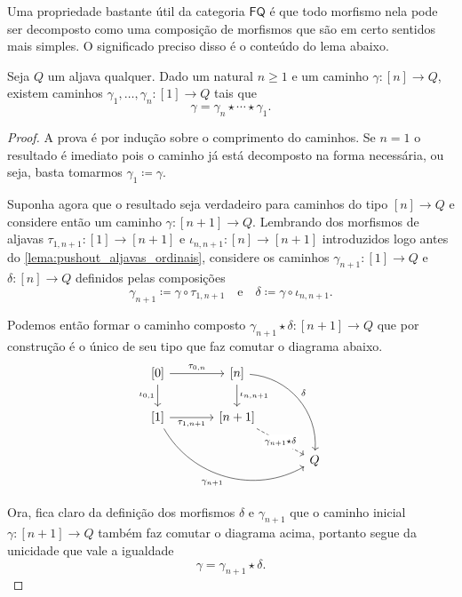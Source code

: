 Uma propriedade bastante útil da categoria $\mathsf{FQ}$ é que todo morfismo nela pode ser decomposto como uma composição de morfismos que são em certo sentidos mais simples.
O significado preciso disso é o conteúdo do lema abaixo.

\begin{lema}\label{lema:decompondo_caminhos_aljava}
    Seja $Q$ um aljava qualquer.
    Dado um natural $n \geq 1$ e um caminho $\gamma: [n] \to Q$, existem caminhos $\gamma_1,\dots,\gamma_n: [1] \to Q$ tais que
    \begin{displaymath}
        \gamma = \gamma_n \star \dotsm \star \gamma_1.
    \end{displaymath}
\end{lema}

\begin{proof}
    A prova é por indução sobre o comprimento do caminhos.
    Se $n = 1$ o resultado é imediato pois o caminho já está decomposto na forma necessária, ou seja, basta tomarmos $\gamma_1 \coloneqq \gamma$.

    Suponha agora que o resultado seja verdadeiro para caminhos do tipo $[n] \to Q$ e considere então um caminho $\gamma: [n+1] \to Q$.
    Lembrando dos morfismos de aljavas $\tau_{1,n+1}: [1] \to [n+1]$ e $\iota_{n,n+1}: [n] \to [n+1]$ introduzidos logo antes do \cref{lema:pushout_aljavas_ordinais}, considere os caminhos $\gamma_{n+1}: [1] \to Q$ e $\delta: [n] \to Q$ definidos pelas composições
    \begin{displaymath}
        \gamma_{n+1} \coloneqq \gamma \circ \tau_{1,n+1}
        \quad \text{e} \quad
        \delta \coloneqq \gamma \circ \iota_{n,n+1}.
    \end{displaymath}
    
    Podemos então formar o caminho composto $\gamma_{n+1} \star \delta: [n+1] \to Q$ que por construção é o único de seu tipo que faz comutar o diagrama abaixo.
    \begin{displaymath}
        \begin{tikzcd}[column sep=1.25cm]
            {[0]}
            \arrow[r, "{\tau_{0,n}}"]
            \arrow[d, "{\iota_{0,1}}" swap]
            & {[n]}
            \arrow[d, "{\iota_{n,n+1}}"]
            \arrow[rdd, bend left=45, "\delta"]
            \\ {[1]}
            \arrow[r, "{\tau_{1,n+1}}" swap]
            \arrow[rrd, bend right=45, "\gamma_{n+1}" swap]
            & {[n+1]}
            \arrow[rd, dashed, "\gamma_{n+1} \star \delta" description]
            \\ & & Q
        \end{tikzcd}
    \end{displaymath}
    Ora, fica claro da definição dos morfismos $\delta$ e $\gamma_{n+1}$ que o caminho inicial $\gamma: [n+1] \to Q$ também faz comutar o diagrama acima, portanto segue da unicidade que vale a igualdade
    \begin{displaymath}
        \gamma = \gamma_{n+1} \star \delta.
    \end{displaymath}


\end{proof}
